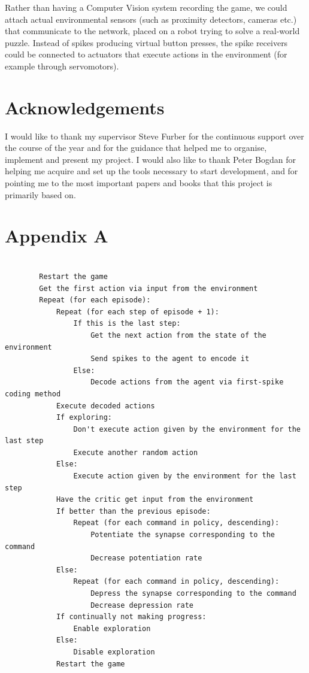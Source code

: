 \documentclass[10pt]{article}
\begin{document}
    Rather than having a Computer Vision system recording the game, we could attach actual environmental sensors (such as proximity detectors, cameras etc.) that communicate to the network, placed on a robot trying to solve a real-world puzzle. Instead of spikes producing virtual button presses, the spike receivers could be connected to actuators that execute actions in the environment (for example through servomotors).

    \section*{Acknowledgements}

    I would like to thank my supervisor Steve Furber for the continuous support over the course of the year and for the guidance that helped me to organise, implement and present my project. I would also like to thank Peter Bogdan for helping me acquire and set up the tools necessary to start development, and for pointing me to the most important papers and books that this project is primarily based on.
    
    \onecolumn

    \newpage
    \section*{Appendix A}

    \begin{lstlisting}[]

        Restart the game
        Get the first action via input from the environment
        Repeat (for each episode):
            Repeat (for each step of episode + 1):
                If this is the last step:
                    Get the next action from the state of the environment
                    Send spikes to the agent to encode it
                Else:
                    Decode actions from the agent via first-spike coding method
            Execute decoded actions
            If exploring:
                Don't execute action given by the environment for the last step
                Execute another random action
            Else:
                Execute action given by the environment for the last step
            Have the critic get input from the environment
            If better than the previous episode:
                Repeat (for each command in policy, descending):
                    Potentiate the synapse corresponding to the command
                    Decrease potentiation rate
            Else:
                Repeat (for each command in policy, descending):
                    Depress the synapse corresponding to the command
                    Decrease depression rate
            If continually not making progress:
                Enable exploration
            Else:
                Disable exploration
            Restart the game
    
    
    \end{lstlisting}    
        
\end{document}
